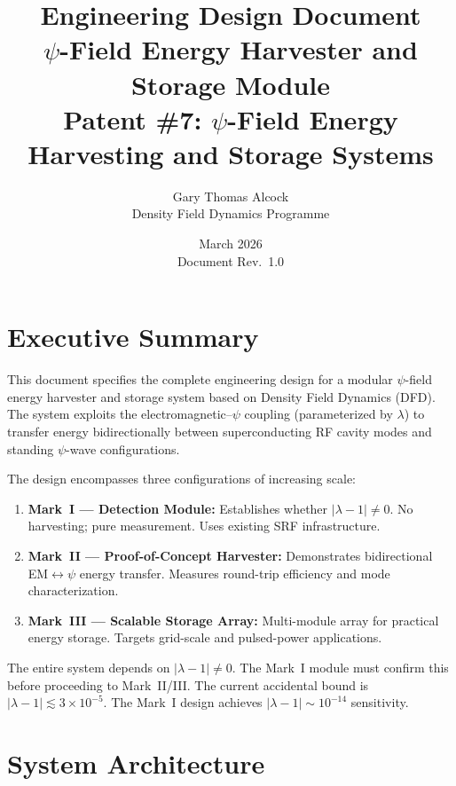 \documentclass[11pt,a4paper]{article}
\title{\Large\textbf{Engineering Design Document} \\[0.5em]
\large $\psi$-Field Energy Harvester and Storage Module \\[0.3em]
\normalsize Patent \#7: $\psi$-Field Energy Harvesting and Storage Systems}
\author{Gary Thomas Alcock \\
\small Density Field Dynamics Programme}
\date{March 2026 \\ \small Document Rev.\ 1.0}
\begin{document}
\maketitle
\tableofcontents
\newpage

\section{Executive Summary}

This document specifies the complete engineering design for a modular
$\psi$-field energy harvester and storage system based on Density Field
Dynamics (DFD).  The system exploits the electromagnetic--$\psi$ coupling
(parameterized by $\lambda$) to transfer energy bidirectionally between
superconducting RF cavity modes and standing $\psi$-wave configurations.

The design encompasses three configurations of increasing scale:

\begin{enumerate}
\item \textbf{Mark~I --- Detection Module:} Establishes whether
$|\lambda-1| \neq 0$.  No harvesting; pure measurement.  Uses existing
SRF infrastructure.

\item \textbf{Mark~II --- Proof-of-Concept Harvester:} Demonstrates
bidirectional EM$\leftrightarrow\psi$ energy transfer.  Measures
round-trip efficiency and mode characterization.

\item \textbf{Mark~III --- Scalable Storage Array:} Multi-module array
for practical energy storage.  Targets grid-scale and pulsed-power
applications.
\end{enumerate}

\begin{tcolorbox}[colback=red!5!white, colframe=red!60!black, title=Critical Dependency]
The entire system depends on $|\lambda-1| \neq 0$.  The Mark~I module
must confirm this before proceeding to Mark~II/III.  The current
accidental bound is $|\lambda-1| \lesssim 3\times 10^{-5}$.  The
Mark~I design achieves $|\lambda-1| \sim 10^{-14}$ sensitivity.
\end{tcolorbox}

\section{System Architecture}
\end{document}
